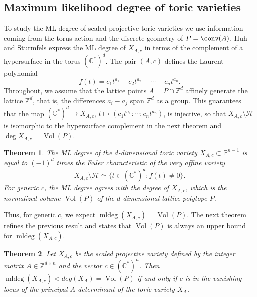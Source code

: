 \documentclass[12pt,reqno]{amsart}   	%
\theoremstyle{plain}
\newtheorem{theorem}{Theorem}[section]
\theoremstyle{definition}
\theoremstyle{remark}
\newcommand{\HH}{\mathcal{H}}
\newcommand{\Z}{\mathbb{Z}}
\newcommand{\C}{\mathbb{C}}
\newcommand{\pp}{\mathbb{P}}
\newcommand{\vol}{\operatorname{Vol}}
\newcommand{\mldeg}{\operatorname{mldeg}}
\begin{document}
\subsection{Maximum likelihood degree of toric varieties}
To study the ML degree of scaled projective toric varieties we use information coming from the torus action and the discrete geometry of $P=\conv(A)$.
Huh and Sturmfels \cite{huhsturmfels2014} express the ML degree of  $X_{A,c}$ in terms of the complement of a hypersurface in the torus $(\C^{\ast})^d$.
The pair $(A,c)$ defines the Laurent polynomial
\[
f(t)=c_1t^{a_1}+c_2t^{a_2}+\cdots+c_nt^{a_n}.
\] Throughout, we assume that the lattice points $A=P\cap\Z^d$ affinely generate
the lattice $\Z^d$, that is, the differences $a_i-a_j$ span $\Z^d$ as a group.
This guarantees that the map $(\C^\ast)^d\to X_{A,c}$, $t\mapsto(c_1t^{a_1}:\cdots:c_nt^{a_n})$,
is injective, so that $X_{A,c}\setminus\HH$ is isomorphic to the hypersurface complement
in the next theorem and $\deg X_{A,c}=\vol(P)$.
\begin{theorem}\cite[Theorem 3.2]{huhsturmfels2014} \label{thm:HuhSturmfels}
    The ML degree of the $d$-dimensional toric variety $X_{A,c}\subset \pp^{n-1}$ is equal to $(-1)^d$ times the Euler characteristic of the very affine variety
    \[
    X_{A,c}\setminus \mathcal{H}\simeq \{t\in (\C^{\ast})^d: f(t)\neq 0\}.
    \]
    For generic $c$, the ML degree agrees with the degree of $X_{A,c}$, which is the normalized volume $\vol(P)$ of the $d$-dimensional lattice
    polytope $P$.
\end{theorem}
Thus, for generic $c$, we expect $
\mldeg(X_{A,c})=\vol(P)$.
The next theorem refines the previous result and states that $\vol(P)$ is always an upper bound for $\mldeg(X_{A,c})$.
\begin{theorem}\cite[Theorem 2, Corollary 8]{amendola2019}
    Let $X_{A,c}$ be the scaled projective variety defined by the integer matrix $A\in \Z^{d\times n} $ and the vector $c\in(\C^{\ast})^n$.
    Then $\mldeg(X_{A,c})<deg(X_A)=\vol(P)$
    if and only if $c$ is in the vanishing locus of the principal $A$-determinant of the toric variety $X_A$.
\end{theorem}
\end{document}
